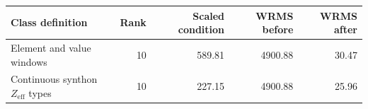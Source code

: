 \begin{tabular}{lrrrr}
\toprule
Class definition & Rank & Scaled condition & WRMS before & WRMS after \\
\midrule
Element and value windows & 10 & 589.81 & 4900.88 & 30.47 \\
Continuous synthon $Z_\mathrm{eff}$ types & 10 & 227.15 & 4900.88 & 25.96 \\
\bottomrule
\end{tabular}
